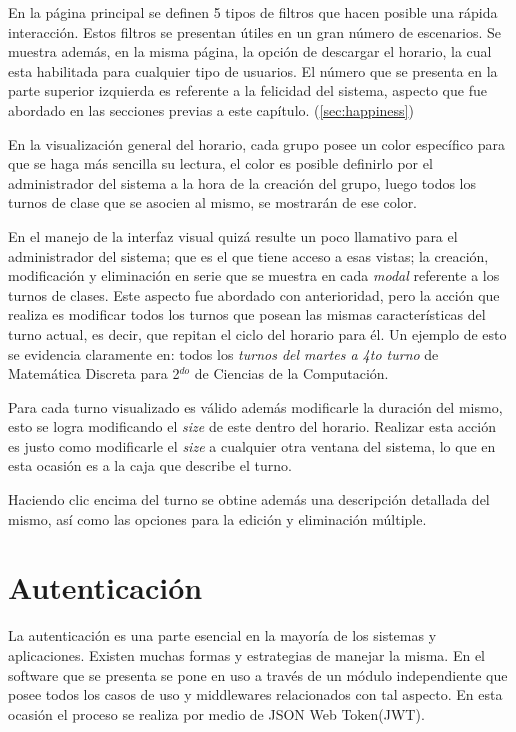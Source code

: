 En la página principal se definen 5 tipos de filtros que hacen posible una rápida interacción. Estos filtros se presentan útiles en un gran número de escenarios. Se muestra además, en la misma página, la opción de descargar el horario, la cual esta habilitada para cualquier tipo de usuarios. El número que se presenta en la parte superior izquierda es referente a la felicidad del sistema, aspecto que fue abordado en las secciones previas a este capítulo. (\ref{sec:happiness})

En la visualización general del horario, cada grupo posee un color específico para que se haga más sencilla su lectura, el color es posible definirlo por el administrador del sistema a la hora de la creación del grupo, luego todos los turnos de clase que se asocien al mismo, se mostrarán de ese color.

En el manejo de la interfaz visual quizá resulte un poco llamativo para el administrador del sistema; que es el que tiene acceso a esas vistas; la creación, modificación y eliminación en serie que se muestra en cada \textit{modal} referente a los turnos de clases.  Este aspecto fue abordado con anterioridad, pero la acción que realiza es modificar todos los turnos que posean las mismas características del turno actual, es decir, que repitan el ciclo del horario para él. Un ejemplo de esto se evidencia claramente en: todos los \textit{turnos del martes a 4to turno} de Matemática Discreta para 2$^{do}$ de Ciencias de la Computación.

Para cada turno visualizado es válido además modificarle la duración del mismo, esto se logra modificando el \textit{size} de este dentro del horario. Realizar esta acción es justo como modificarle el \textit{size} a cualquier otra ventana del sistema, lo que en esta ocasión es a la caja que describe el turno.

Haciendo clic encima del turno se obtine además una descripción detallada del mismo, así como las opciones para la edición y eliminación múltiple.

\section{Autenticación}

La autenticación es una parte esencial en la mayoría de los sistemas y aplicaciones. Existen muchas formas y estrategias de manejar la misma. En el software que se presenta se pone en uso a través de un módulo independiente que posee todos los casos de uso y middlewares relacionados con tal aspecto. En esta ocasión el proceso se realiza por medio de JSON Web Token(JWT).

